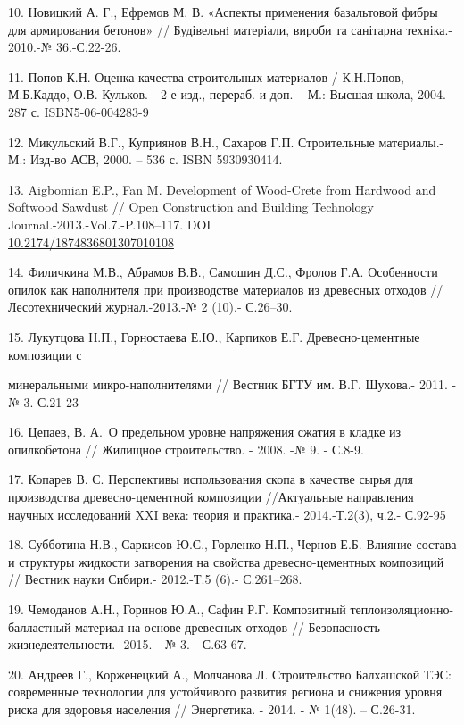 \begin{references}
10. Новицкий А. Г., Ефремов М. В. «Аспекты применения базальтовой фибры
для армирования бетонов» // Будівельнi матеріали, вироби та санітарна
техніка.- 2010.-№ 36.-С.22-26.
\href{http://www.irbis-nbuv.gov.ua/cgi-bin/irbis_nbuv/cgiirbis_64.exe?I21DBN=LINK&P21DBN=UJRN&Z21ID=&S21REF=10&S21CNR=20&S21STN=1&S21FMT=ASP_meta&C21COM=S&2_S21P03=FILA=&2_S21STR=bmvs_2010_36_5}{}

11. Попов К.Н. Оценка качества строительных материалов / К.Н.Попов,
М.Б.Каддо, О.В. Кульков. - 2-е изд., перераб. и доп. -- М.: Высшая
школа, 2004.- 287 с. ISBN5-06-004283-9

12. Микульский В.Г., Куприянов В.Н., Сахаров Г.П. Строительные
материалы.- М.: Изд-во АСВ, 2000. -- 536 с. ISBN 5930930414.

13. Aigbomian E.P., Fan M. Development of Wood-Crete from Hardwood and
Softwood Sawdust // Open Construction and Building Technology
Journal.-2013.-Vol.7.-P.108--117.
DOI\\
\href{http://dx.doi.org/10.2174/1874836801307010108}{10.2174/1874836801307010108}

14. Филичкина М.В., Абрамов В.В., Самошин Д.С., Фролов Г.А. Особенности
опилок как наполнителя при производстве материалов из древесных отходов
// Лесотехнический журнал.-2013.-№ 2 (10).- С.26--30.

15. Лукутцова Н.П., Горностаева Е.Ю., Карпиков Е.Г. Древесно-цементные
композиции с

минеральными микро-наполнителями // Вестник БГТУ им. В.Г. Шухова.-
2011. -№ 3.-С.21-23

16. Цепаев, В. А.~О предельном уровне напряжения сжатия в кладке из
опилкобетона // Жилищное строительство. - 2008. -№ 9. - С.8-9.

17. Копарев В. С. Перспективы использования скопа в качестве сырья для
производства древесно-цементной композиции //Актуальные направления
научных исследований XXI века: теория и прак\-тика.- 2014.-Т.2(3), ч.2.-
С.92-95

18. Субботина Н.В., Саркисов Ю.С., Горленко Н.П., Чернов Е.Б. Влияние
состава и структуры жидкости затворения на свойства древесно-цементных
композиций // Вестник науки Сибири.- 2012.-Т.5 (6).- С.261--268.

19. Чемоданов А.Н., Горинов Ю.А., Сафин Р.Г. Композитный
теплоизоляционно-балластный материал на основе древесных отходов //
Безопасность жизнедеятельности.- 2015. - № 3. - С.63-67.

20. Андреев Г., Корженецкий А., Молчанова Л. Строительство Балхашской
ТЭС: современные технологии для устойчивого развития региона и снижения
уровня риска для здоровья населения // Энергетика. - 2014. - № 1(48). --
С.26-31.
\end{references}

